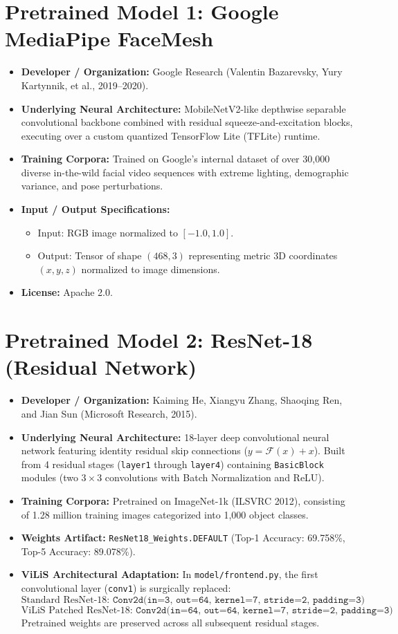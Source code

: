 \documentclass[11pt,a4paper]{report}
\begin{document}
\section{Pretrained Model 1: Google MediaPipe FaceMesh}
\begin{itemize}
    \item \textbf{Developer / Organization:} Google Research (Valentin Bazarevsky, Yury Kartynnik, et al., 2019--2020).
    \item \textbf{Underlying Neural Architecture:} MobileNetV2-like depthwise separable convolutional backbone combined with residual squeeze-and-excitation blocks, executing over a custom quantized TensorFlow Lite (TFLite) runtime.
    \item \textbf{Training Corpora:} Trained on Google’s internal dataset of over 30,000 diverse in-the-wild facial video sequences with extreme lighting, demographic variance, and pose perturbations.
    \item \textbf{Input / Output Specifications:}
    \begin{itemize}
        \item Input: RGB image normalized to $[-1.0, 1.0]$.
        \item Output: Tensor of shape $(468, 3)$ representing metric 3D coordinates $(x, y, z)$ normalized to image dimensions.
    \end{itemize}
    \item \textbf{License:} Apache 2.0.
\end{itemize}

\section{Pretrained Model 2: ResNet-18 (Residual Network)}
\begin{itemize}
    \item \textbf{Developer / Organization:} Kaiming He, Xiangyu Zhang, Shaoqing Ren, and Jian Sun (Microsoft Research, 2015).
    \item \textbf{Underlying Neural Architecture:} 18-layer deep convolutional neural network featuring identity residual skip connections ($y = \mathcal{F}(x) + x$). Built from 4 residual stages (\texttt{layer1} through \texttt{layer4}) containing \texttt{BasicBlock} modules (two $3 \times 3$ convolutions with Batch Normalization and ReLU).
    \item \textbf{Training Corpora:} Pretrained on ImageNet-1k (ILSVRC 2012), consisting of 1.28 million training images categorized into 1,000 object classes.
    \item \textbf{Weights Artifact:} \texttt{ResNet18\_Weights.DEFAULT} (Top-1 Accuracy: 69.758\%, Top-5 Accuracy: 89.078\%).
    \item \textbf{ViLiS Architectural Adaptation:} In \texttt{model/frontend.py}, the first convolutional layer (\texttt{conv1}) is surgically replaced:
    $$\text{Standard ResNet-18: } \texttt{Conv2d(in=3, out=64, kernel=7, stride=2, padding=3)}$$
    $$\text{ViLiS Patched ResNet-18: } \texttt{Conv2d(in=64, out=64, kernel=7, stride=2, padding=3)}$$
    Pretrained weights are preserved across all subsequent residual stages.
\end{itemize}
\end{document}
